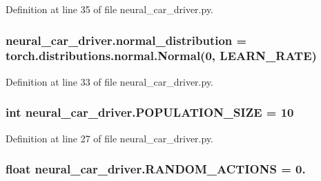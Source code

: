 Definition at line 35 of file neural\+\_\+car\+\_\+driver.\+py.

\subsubsection[{\texorpdfstring{normal\+\_\+distribution}{normal_distribution}}]{\setlength{\rightskip}{0pt plus 5cm}neural\+\_\+car\+\_\+driver.\+normal\+\_\+distribution = torch.\+distributions.\+normal.\+Normal(0, {\bf L\+E\+A\+R\+N\+\_\+\+R\+A\+TE})}\hypertarget{namespaceneural__car__driver_a953d05d55cd2232a21159009976855f3}{}\label{namespaceneural__car__driver_a953d05d55cd2232a21159009976855f3}


Definition at line 33 of file neural\+\_\+car\+\_\+driver.\+py.

\subsubsection[{\texorpdfstring{P\+O\+P\+U\+L\+A\+T\+I\+O\+N\+\_\+\+S\+I\+ZE}{POPULATION_SIZE}}]{\setlength{\rightskip}{0pt plus 5cm}int neural\+\_\+car\+\_\+driver.\+P\+O\+P\+U\+L\+A\+T\+I\+O\+N\+\_\+\+S\+I\+ZE = 10}\hypertarget{namespaceneural__car__driver_aaf8ade0766a9fd72a41c1029d04d6d5e}{}\label{namespaceneural__car__driver_aaf8ade0766a9fd72a41c1029d04d6d5e}


Definition at line 27 of file neural\+\_\+car\+\_\+driver.\+py.

\subsubsection[{\texorpdfstring{R\+A\+N\+D\+O\+M\+\_\+\+A\+C\+T\+I\+O\+NS}{RANDOM_ACTIONS}}]{\setlength{\rightskip}{0pt plus 5cm}float neural\+\_\+car\+\_\+driver.\+R\+A\+N\+D\+O\+M\+\_\+\+A\+C\+T\+I\+O\+NS = 0.}\hypertarget{namespaceneural__car__driver_afb68376c882e8c25519918f9d079e6c0}{}\label{namespaceneural__car__driver_afb68376c882e8c25519918f9d079e6c0}


